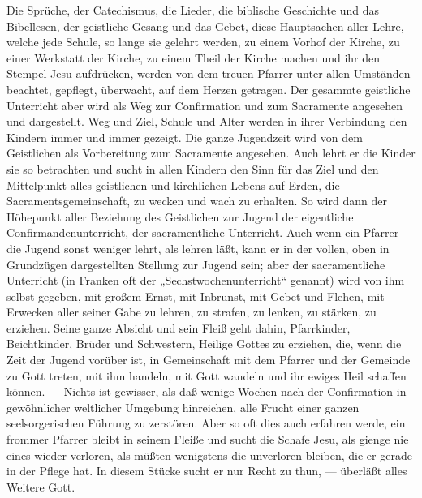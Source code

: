 Die Sprüche, der Catechismus, die Lieder, die biblische Geschichte und das Bibellesen, der geistliche Gesang und das Gebet, diese Hauptsachen aller Lehre, welche jede Schule, so lange sie gelehrt werden, zu einem Vorhof der Kirche, zu einer Werkstatt der Kirche, zu einem Theil der Kirche machen und ihr den Stempel Jesu aufdrücken, werden von dem treuen Pfarrer unter allen Umständen beachtet, gepflegt, überwacht, auf dem Herzen getragen. Der gesammte geistliche Unterricht aber wird als Weg zur Confirmation und zum Sacramente angesehen und dargestellt. Weg und Ziel, Schule und Alter werden in ihrer Verbindung den Kindern immer und immer gezeigt. Die ganze Jugendzeit wird von dem Geistlichen als Vorbereitung zum Sacramente angesehen. Auch lehrt er die Kinder sie so betrachten und sucht in allen Kindern den Sinn für das Ziel und den Mittelpunkt alles geistlichen und kirchlichen Lebens auf Erden, die Sacramentsgemeinschaft, zu wecken und wach zu erhalten. So wird dann der Höhepunkt aller Beziehung des Geistlichen zur Jugend der eigentliche Confirmandenunterricht, der sacramentliche Unterricht. Auch wenn ein Pfarrer die Jugend sonst weniger lehrt, als lehren läßt, kann er in der vollen, oben in Grundzügen dargestellten Stellung zur Jugend sein; aber der sacramentliche Unterricht (in Franken oft der „Sechstwochenunterricht“ genannt) wird von ihm selbst gegeben, mit großem Ernst, mit Inbrunst, mit Gebet und Flehen, mit Erwecken aller seiner Gabe zu lehren, zu strafen, zu lenken, zu stärken, zu erziehen. Seine ganze Absicht und sein Fleiß geht dahin, Pfarrkinder, Beichtkinder, Brüder und Schwestern,
Heilige Gottes zu erziehen, die, wenn die Zeit der Jugend vorüber ist, in Gemeinschaft mit dem Pfarrer und der Gemeinde zu Gott treten, mit ihm handeln, mit Gott wandeln und ihr ewiges Heil schaffen können. — Nichts ist gewisser, als daß wenige Wochen nach der Confirmation in gewöhnlicher weltlicher Umgebung hinreichen, alle Frucht einer ganzen seelsorgerischen Führung zu zerstören. Aber so oft dies auch erfahren werde, ein frommer Pfarrer bleibt in seinem Fleiße und sucht die Schafe Jesu, als gienge nie eines wieder verloren, als müßten wenigstens die unverloren bleiben, die er gerade in der Pflege hat. In diesem Stücke sucht er nur Recht zu thun, — überläßt alles Weitere Gott.

